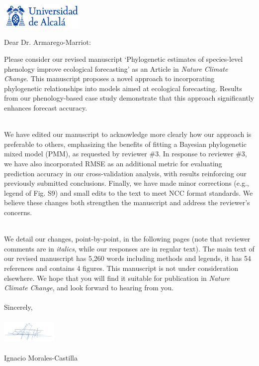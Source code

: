 \documentclass[11pt,a4paper]{letter}
\begin{document}
\begin{letter}{}
\includegraphics[width=0.3\textwidth]{logo_uah.png}

\opening{Dear Dr. Armarego-Marriot:} %

\noindent Please consider our revised manuscript `Phylogenetic estimates of species-level phenology improve ecological forecasting' as an Article in \emph{Nature Climate Change}. This manuscript proposes a novel approach to incorporating phylogenetic relationships into models aimed at ecological forecasting. Results from our phenology-based case study demonstrate that this approach significantly enhances forecast accuracy.


\vspace{1.5ex}\\
\noindent We have edited our manuscript to acknowledge more clearly how our approach is preferable to others, emphasizing the benefits of fitting a Bayesian phylogenetic mixed model (PMM), as requested by reviewer \#3. In response to reviewer \#3, we have also incorporated RMSE as an additional metric for evaluating prediction accuracy in our cross-validation analysis, with results reinforcing our previously submitted conclusions. Finally, we have made minor corrections (e.g., legend of Fig. S9) and small edits to the text to meet NCC format standards. We believe these changes both strengthen the manuscript and address the reviewer's concerns. 


\vspace{1.5ex}\\
\noindent We detail our changes, point-by-point, in the following pages (note that reviewer comments are in \emph{italics}, while our responses are in regular text). The main text of our revised manuscript has 5,260 words including methods and legends, it has 54 references and contains 4 figures. This manuscript is not under consideration elsewhere.  We hope that you will find it suitable for publication in \emph{Nature Climate Change}, and look forward to hearing from you.
\vspace{2.5ex}\\



\vspace{1.5ex}\\
\noindent Sincerely,\\
\vspace{1.5ex}\\
 \includegraphics[width=0.2\textwidth]{Signature_IMC.png} \\
 \vspace{1.5ex}\\
\noindent Ignacio Morales-Castilla



\end{letter}
\end{document}
